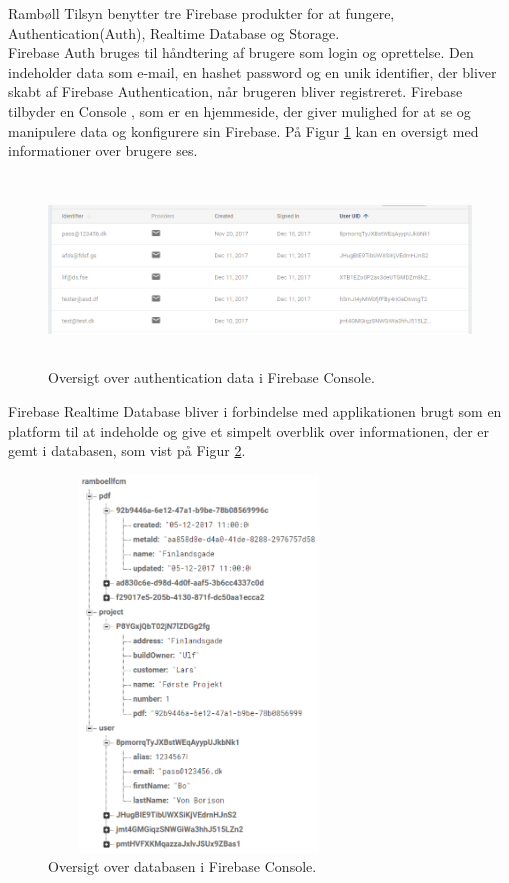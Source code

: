 Rambøll Tilsyn benytter tre Firebase produkter for at fungere, Authentication(Auth), Realtime Database og Storage.\\

 Firebase Auth\cite{FirebaseAuth} bruges til håndtering af brugere som login og oprettelse. Den indeholder data som e-mail, en hashet password og en unik identifier, der bliver skabt af Firebase Authentication, når brugeren bliver registreret. Firebase tilbyder en Console , som er en hjemmeside, der giver mulighed for at se og manipulere data og konfigurere sin Firebase. På Figur \ref{fig:FirebaseAuthPNG} kan en oversigt med informationer over brugere ses. 
\begin{figure}[H] %
	\centering
	\includegraphics[height=5cm, width=15cm]{../ArkitekturDesign/Design/Firebase/FirebaseAuth.PNG}
	\caption{Oversigt over authentication data i Firebase Console.}
	\label{fig:FirebaseAuthPNG}
\end{figure}

Firebase Realtime Database bliver i forbindelse med applikationen brugt som en platform til at indeholde og give et simpelt overblik over informationen, der er gemt i databasen, som vist på Figur \ref{fig:FirebaseDBPNG}.  
 
\begin{figure}[H] %
	\centering
	\includegraphics[height=10cm, width=8cm]{../ArkitekturDesign/Design/Firebase/FirebaseDB.PNG}
	\caption{Oversigt over databasen i Firebase Console.}
	\label{fig:FirebaseDBPNG}
\end{figure}

